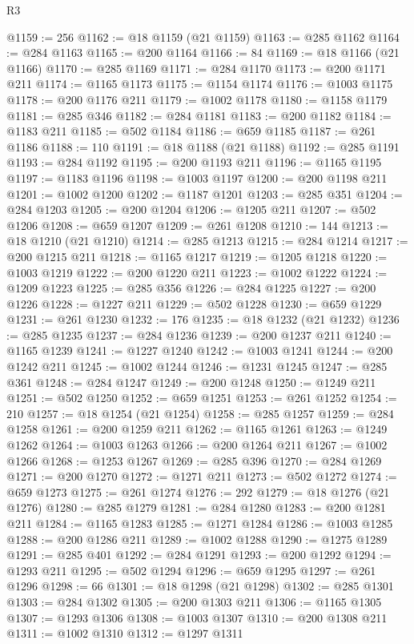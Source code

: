 \begin{lexlean}{R3}
\begin{coremodule}
@1159 := 256
@1162 := @18 @1159 (@21 @1159)
@1163 := @285 @1162
@1164 := @284 @1163
@1165 := @200 @1164
@1166 := 84
@1169 := @18 @1166 (@21 @1166)
@1170 := @285 @1169
@1171 := @284 @1170
@1173 := @200 @1171 @211
@1174 := @1165 @1173
@1175 := @1154 @1174
@1176 := @1003 @1175
@1178 := @200 @1176 @211
@1179 := @1002 @1178
@1180 := @1158 @1179
@1181 := @285 @346
@1182 := @284 @1181
@1183 := @200 @1182
@1184 := @1183 @211
@1185 := @502 @1184
@1186 := @659 @1185
@1187 := @261 @1186
@1188 := 110
@1191 := @18 @1188 (@21 @1188)
@1192 := @285 @1191
@1193 := @284 @1192
@1195 := @200 @1193 @211
@1196 := @1165 @1195
@1197 := @1183 @1196
@1198 := @1003 @1197
@1200 := @200 @1198 @211
@1201 := @1002 @1200
@1202 := @1187 @1201
@1203 := @285 @351
@1204 := @284 @1203
@1205 := @200 @1204
@1206 := @1205 @211
@1207 := @502 @1206
@1208 := @659 @1207
@1209 := @261 @1208
@1210 := 144
@1213 := @18 @1210 (@21 @1210)
@1214 := @285 @1213
@1215 := @284 @1214
@1217 := @200 @1215 @211
@1218 := @1165 @1217
@1219 := @1205 @1218
@1220 := @1003 @1219
@1222 := @200 @1220 @211
@1223 := @1002 @1222
@1224 := @1209 @1223
@1225 := @285 @356
@1226 := @284 @1225
@1227 := @200 @1226
@1228 := @1227 @211
@1229 := @502 @1228
@1230 := @659 @1229
@1231 := @261 @1230
@1232 := 176
@1235 := @18 @1232 (@21 @1232)
@1236 := @285 @1235
@1237 := @284 @1236
@1239 := @200 @1237 @211
@1240 := @1165 @1239
@1241 := @1227 @1240
@1242 := @1003 @1241
@1244 := @200 @1242 @211
@1245 := @1002 @1244
@1246 := @1231 @1245
@1247 := @285 @361
@1248 := @284 @1247
@1249 := @200 @1248
@1250 := @1249 @211
@1251 := @502 @1250
@1252 := @659 @1251
@1253 := @261 @1252
@1254 := 210
@1257 := @18 @1254 (@21 @1254)
@1258 := @285 @1257
@1259 := @284 @1258
@1261 := @200 @1259 @211
@1262 := @1165 @1261
@1263 := @1249 @1262
@1264 := @1003 @1263
@1266 := @200 @1264 @211
@1267 := @1002 @1266
@1268 := @1253 @1267
@1269 := @285 @396
@1270 := @284 @1269
@1271 := @200 @1270
@1272 := @1271 @211
@1273 := @502 @1272
@1274 := @659 @1273
@1275 := @261 @1274
@1276 := 292
@1279 := @18 @1276 (@21 @1276)
@1280 := @285 @1279
@1281 := @284 @1280
@1283 := @200 @1281 @211
@1284 := @1165 @1283
@1285 := @1271 @1284
@1286 := @1003 @1285
@1288 := @200 @1286 @211
@1289 := @1002 @1288
@1290 := @1275 @1289
@1291 := @285 @401
@1292 := @284 @1291
@1293 := @200 @1292
@1294 := @1293 @211
@1295 := @502 @1294
@1296 := @659 @1295
@1297 := @261 @1296
@1298 := 66
@1301 := @18 @1298 (@21 @1298)
@1302 := @285 @1301
@1303 := @284 @1302
@1305 := @200 @1303 @211
@1306 := @1165 @1305
@1307 := @1293 @1306
@1308 := @1003 @1307
@1310 := @200 @1308 @211
@1311 := @1002 @1310
@1312 := @1297 @1311

\end{coremodule}
\end{lexlean}
